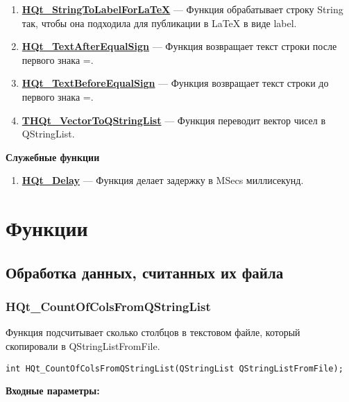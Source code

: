 \documentclass[a4paper,12pt]{article}
\begin{document}
\begin{enumerate}
\item \textbf{\hyperref[HQt_StringToLabelForLaTeX]{HQt\_StringToLabelForLaTeX}} --- Функция обрабатывает строку String так, чтобы она подходила для публикации в LaTeX в виде label.

\item \textbf{\hyperref[HQt_TextAfterEqualSign]{HQt\_TextAfterEqualSign}} --- Функция возвращает текст строки после первого знака =.

\item \textbf{\hyperref[HQt_TextBeforeEqualSign]{HQt\_TextBeforeEqualSign}} --- Функция возвращает текст строки до первого знака =.

\item \textbf{\hyperref[THQt_VectorToQStringList]{THQt\_VectorToQStringList}} --- Функция переводит вектор чисел в QStringList.

\end{enumerate}

\textbf{Служебные функции}
\begin{enumerate}

\item \textbf{\hyperref[HQt_Delay]{HQt\_Delay}} --- Функция делает задержку в MSecs миллисекунд.

\end{enumerate}


\newpage
\section{Функции}
\subsection{Обработка данных, считанных их файла}

\subsubsection{HQt\_CountOfColsFromQStringList}\label{HQt_CountOfColsFromQStringList}

Функция подсчитывает сколько столбцов в текстовом файле, который скопировали в QStringListFromFile.


\begin{lstlisting}[label=code_syntax_HQt_CountOfColsFromQStringList,caption=Синтаксис]
int HQt_CountOfColsFromQStringList(QStringList QStringListFromFile);
\end{lstlisting}

\textbf{Входные параметры:}
\end{document}
